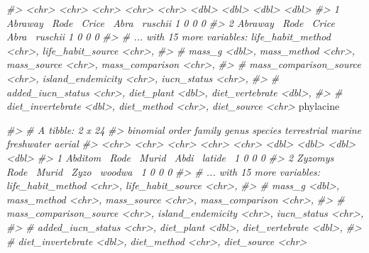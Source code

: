 \documentclass[]{book}
\newenvironment{Shaded}{}{}
\newcommand{\CommentTok}[1]{\textcolor[rgb]{0.38,0.63,0.69}{\textit{#1}}}
\newcommand{\DecValTok}[1]{\textcolor[rgb]{0.25,0.63,0.44}{#1}}
\newcommand{\KeywordTok}[1]{\textcolor[rgb]{0.00,0.44,0.13}{\textbf{#1}}}
\newcommand{\NormalTok}[1]{#1}
\newcommand{\OperatorTok}[1]{\textcolor[rgb]{0.40,0.40,0.40}{#1}}
\newcommand{\StringTok}[1]{\textcolor[rgb]{0.25,0.44,0.63}{#1}}
\begin{document}
\begin{Shaded}
\begin{Highlighting}[]
{{{\CommentTok{#>   <chr>    <chr> <chr>  <chr> <chr>         <dbl>  <dbl>      <dbl>  <dbl>}
\CommentTok{#> 1 Abraway~ Rode~ Crice~ Abra~ ruschii           1      0          0      0}
\CommentTok{#> 2 Abraway~ Rode~ Crice~ Abra~ ruschii           1      0          0      0}
\CommentTok{#> # ... with 15 more variables: life_habit_method <chr>, life_habit_source <chr>,}
\CommentTok{#> #   mass_g <dbl>, mass_method <chr>, mass_source <chr>, mass_comparison <chr>,}
\CommentTok{#> #   mass_comparison_source <chr>, island_endemicity <chr>, iucn_status <chr>,}
\CommentTok{#> #   added_iucn_status <chr>, diet_plant <dbl>, diet_vertebrate <dbl>,}
\CommentTok{#> #   diet_invertebrate <dbl>, diet_method <chr>, diet_source <chr>}
\NormalTok{phylacine }\OperatorTok{%
\CommentTok{#> # A tibble: 2 x 24}
\CommentTok{#>   binomial order family genus species terrestrial marine freshwater aerial}
\CommentTok{#>   <chr>    <chr> <chr>  <chr> <chr>         <dbl>  <dbl>      <dbl>  <dbl>}
\CommentTok{#> 1 Abditom~ Rode~ Murid~ Abdi~ latide~           1      0          0      0}
\CommentTok{#> 2 Zyzomys~ Rode~ Murid~ Zyzo~ woodwa~           1      0          0      0}
\CommentTok{#> # ... with 15 more variables: life_habit_method <chr>, life_habit_source <chr>,}
\CommentTok{#> #   mass_g <dbl>, mass_method <chr>, mass_source <chr>, mass_comparison <chr>,}
\CommentTok{#> #   mass_comparison_source <chr>, island_endemicity <chr>, iucn_status <chr>,}
\CommentTok{#> #   added_iucn_status <chr>, diet_plant <dbl>, diet_vertebrate <dbl>,}
\CommentTok{#> #   diet_invertebrate <dbl>, diet_method <chr>, diet_source <chr>}

}}}}
\end{Highlighting}
\end{Shaded}
\end{document}
